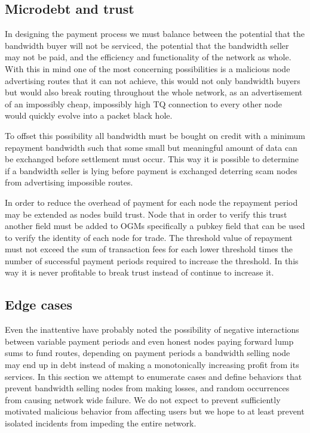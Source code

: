 \documentclass[11pt]{article}
\begin{document}
	\subsection{Microdebt and trust}

               In designing the payment process we must balance between the potential that the bandwidth buyer will not be serviced, the potential that the bandwidth seller may not be paid, and the efficiency and functionality of the network as whole. With this in mind one of the most concerning possibilities is a malicious node advertising routes that it can not achieve, this would not only bandwidth buyers but would also break routing throughout the whole network, as an advertisement of an impossibly cheap, impossibly high TQ connection to every other node would quickly evolve into a packet black hole.

               To offset this possibility all bandwidth must be bought on credit with a minimum repayment bandwidth such that some small but meaningful amount of data can be exchanged before settlement must occur. This way it is possible to determine if a bandwidth seller is lying before payment is exchanged deterring scam nodes from advertising impossible routes.

               In order to reduce the overhead of payment for each node the repayment period may be extended as nodes build trust. Node that in order to verify this trust another field must be added to OGMs specifically a pubkey field that can be used to verify the identity of each node for trade. The threshold value of repayment must not exceed the sum of transaction fees for each lower threshold times the number of successful payment periods required to increase the threshold. In this way it is never profitable to break trust instead of continue to increase it.

	\subsection{Edge cases}
               Even the inattentive have probably noted the possibility of negative interactions between variable payment periods and even honest nodes paying forward lump sums to fund routes, depending on payment periods a bandwidth selling node may end up in debt instead of making a monotonically increasing profit from its services. In this section we attempt to enumerate cases and define behaviors that prevent bandwidth selling nodes from making losses, and random occurrences from causing network wide failure. We do not expect to prevent sufficiently motivated malicious behavior from affecting users but we hope to at least prevent isolated incidents from impeding the entire network.
\end{document}
